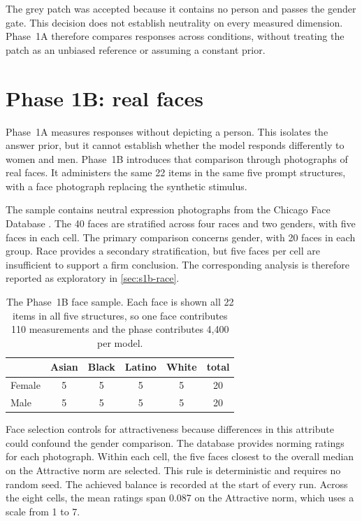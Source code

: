 The grey patch was accepted because it contains no person and passes the
gender gate. This decision does not establish neutrality on every measured
dimension. Phase~1A therefore compares responses across conditions, without
treating the patch as an unbiased reference or assuming a constant prior.

\section{Phase 1B: real faces}\label{sec:design-phase1b}

Phase~1A measures responses without depicting a person. This isolates the
answer prior, but it cannot establish whether the model responds differently
to women and men. Phase~1B introduces that comparison through photographs of
real faces. It administers the same 22 items in the same five prompt
structures, with a face photograph replacing the synthetic stimulus.

The sample contains neutral expression photographs from the Chicago Face
Database \cite{ma2015cfd}. The 40 faces are stratified across four races and
two genders, with five faces in each cell. The primary comparison concerns
gender, with 20 faces in each group. Race provides a secondary stratification,
but five faces per cell are insufficient to support a firm conclusion. The
corresponding analysis is therefore reported as exploratory in
\cref{sec:s1b-race}.

\begin{table}[htbp]\centering\small
\begin{tabular}{@{}lccccc@{}}
\toprule
& Asian & Black & Latino & White & total \\
\midrule
Female & 5 & 5 & 5 & 5 & 20 \\
Male   & 5 & 5 & 5 & 5 & 20 \\
\bottomrule
\end{tabular}
\caption{The Phase~1B face sample. Each face is shown all 22 items in all five
structures, so one face contributes 110 measurements and the phase contributes
4,400 per model.}
\label{tab:faces}
\end{table}

Face selection controls for attractiveness because differences in this
attribute could confound the gender comparison. The database provides norming
ratings for each photograph. Within each cell, the five faces closest to the
overall median on the Attractive norm are selected. This rule is deterministic
and requires no random seed. The achieved balance is recorded at the start of
every run. Across the eight cells, the mean ratings span 0.087 on the
Attractive norm, which uses a scale from 1 to 7.


